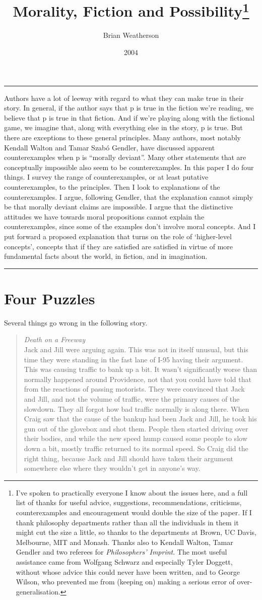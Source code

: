 \documentclass[
  10pt,
  letterpaper,
  DIV=11,
  numbers=noendperiod,
  twoside]{scrartcl}
\title{Morality, Fiction and Possibility\thanks{I've spoken to
practically everyone I know about the issues here, and a full list of
thanks for useful advice, suggestions, recommendations, criticisms,
counterexamples and encouragement would double the size of the paper. If
I thank philosophy departments rather than all the individuals in them
it might cut the size a little, so thanks to the departments at Brown,
UC Davis, Melbourne, MIT and Monash. Thanks also to Kendall Walton,
Tamar Gendler and two referees for \emph{Philosophers' Imprint}. The
most useful assistance came from Wolfgang Schwarz and especially Tyler
Doggett, without whose advice this could never have been written, and to
George Wilson, who prevented me from (keeping on) making a serious error
of over-generalisation.}}
\author{Brian Weatherson}
\date{2004}
\renewenvironment{abstract}
 {\vspace{-1.25cm}
 \quotation\small\noindent\rule{\linewidth}{.5pt}\par\smallskip
 \noindent }
 {\par\noindent\rule{\linewidth}{.5pt}\endquotation}
\begin{document}
\maketitle
\begin{abstract}
Authors have a lot of leeway with regard to what they can make true in
their story. In general, if the author says that p is true in the
fiction we're reading, we believe that p is true in that fiction. And if
we're playing along with the fictional game, we imagine that, along with
everything else in the story, p is true. But there are exceptions to
these general principles. Many authors, most notably Kendall Walton and
Tamar Szabó Gendler, have discussed apparent counterexamples when p is
``morally deviant''. Many other statements that are conceptually
impossible also seem to be counterexamples. In this paper I do four
things. I survey the range of counterexamples, or at least putative
counterexamples, to the principles. Then I look to explanations of the
counterexamples. I argue, following Gendler, that the explanation cannot
simply be that morally deviant claims are impossible. I argue that the
distinctive attitudes we have towards moral propositions cannot explain
the counterexamples, since some of the examples don't involve moral
concepts. And I put forward a proposed explanation that turns on the
role of `higher-level concepts', concepts that if they are satisfied are
satisfied in virtue of more fundamental facts about the world, in
fiction, and in imagination.
\end{abstract}


\section{Four Puzzles}\label{four-puzzles}

Several things go wrong in the following story.

\begin{quote}
\emph{Death on a Freeway}\\
Jack and Jill were arguing again. This was not in itself unusual, but
this time they were standing in the fast lane of I-95 having their
argument. This was causing traffic to bank up a bit. It wasn't
significantly worse than normally happened around Providence, not that
you could have told that from the reactions of passing motorists. They
were convinced that Jack and Jill, and not the volume of traffic, were
the primary causes of the slowdown. They all forgot how bad traffic
normally is along there. When Craig saw that the cause of the bankup had
been Jack and Jill, he took his gun out of the glovebox and shot them.
People then started driving over their bodies, and while the new speed
hump caused some people to slow down a bit, mostly traffic returned to
its normal speed. So Craig did the right thing, because Jack and Jill
should have taken their argument somewhere else where they wouldn't get
in anyone's way.
\end{quote}
\end{document}
